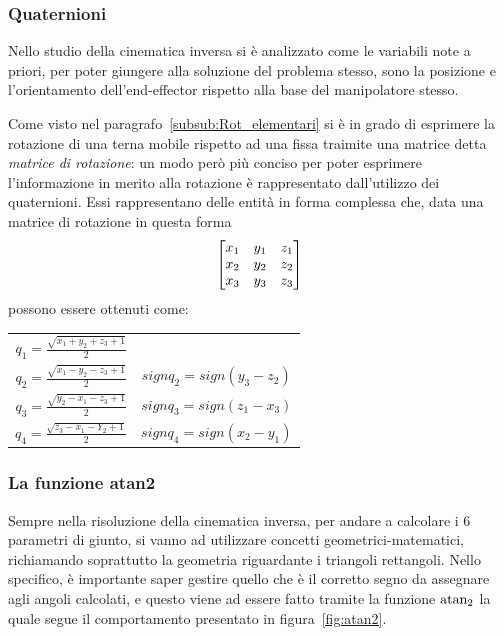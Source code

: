 \subsubsection{Quaternioni}
Nello studio della cinematica inversa si è analizzato come le variabili note a priori, per poter giungere alla soluzione del problema stesso, sono la posizione e l'orientamento dell'end-effector rispetto alla base del manipolatore stesso. 

Come visto nel paragrafo~\vref{subsub:Rot_elementari} si è in grado di esprimere la rotazione di una terna mobile rispetto ad una fissa traimite una matrice detta \emph{matrice di rotazione}: un modo però più conciso per poter esprimere l'informazione in merito alla rotazione è rappresentato dall'utilizzo dei quaternioni. 
Essi rappresentano delle entità in forma complessa che, data una matrice di rotazione in questa forma
\begin{equation}
	\centering
	\begin{bmatrix}
		x_1&y_1&z_1\\
		x_2&y_2&z_2\\	
		x_3&y_3&z_3
	\end{bmatrix}
\end{equation}
possono essere ottenuti come:
\begin{table}[h]
	\label{tab:Quaternion}
	\centering
	\begin{tabular}{cc}
			\midrule
			$q_1=\frac{\sqrt{x_1+y_2+z_3+1}}{2}$ & \\ 
			$q_2=\frac{\sqrt{x_1-y_2-z_3+1}}{2}$ & $sign q_2 = sign(y_3-z_2)$ \\
			$q_3=\frac{\sqrt{y_2-x_1-z_3+1}}{2}$ & $sign q_3 = sign(z_1-x_3)$ \\
			$q_4=\frac{\sqrt{z_3-x_1-Y_2+1}}{2}$ & $sign q_4 = sign(x_2-y_1)$ \\
			\bottomrule  
	\end{tabular}
\end{table}

\subsubsection{La funzione atan2}
\label{subsub:Function_atan2}
Sempre nella risoluzione della cinematica inversa, per andare a calcolare i 6 parametri di giunto, si vanno ad utilizzare concetti geometrici-matematici, richiamando soprattutto la geometria riguardante i triangoli rettangoli. 
Nello specifico, è importante saper gestire quello che è il corretto segno da assegnare agli angoli calcolati, e questo viene ad essere fatto tramite la funzione $\operatorname{atan_2}$ la quale segue il comportamento presentato in figura~\vref{fig:atan2}.

